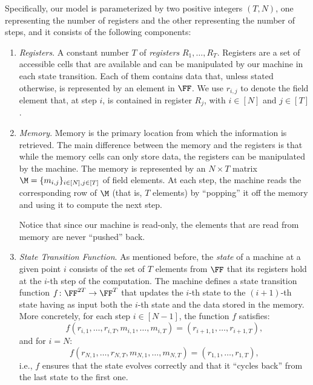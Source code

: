 Specifically, our model is parameterized by two positive integers $(T, N)$, one representing the number of registers and the other representing the number of steps, and it consists of the following components:
\begin{enumerate}
\item \textit{Registers}. A constant number $T$ of \textit{registers} $R_1,\dots,R_T$. Registers are a set of accessible cells that are available and can be manipulated by our machine in each state transition. Each of them contains data that, unless stated otherwise, is represented by an element in $\FF$. We use $r_{i,j}$ to denote the field element that, at step $i$, is contained in register $R_j$, with $i\in[N]$ and $j \in [T]$. 
    

\item \textit{Memory}. Memory is the primary location from which the information is retrieved. The main difference between the memory and the registers is that while the memory cells can only store data, the registers can be manipulated by the machine. The memory is represented by an $N \times T$ matrix $\M = \{m_{i,j}\}_{i\in[N],j\in[T]}$ of field elements. At each step, the machine reads the corresponding row of $\M$ (that is, $T$ elements) by ``popping'' it off the memory and using it to compute the next step. 
\begin{remark}
    Notice that since our machine is read-only, the elements that are read from memory are never ``pushed'' back.
\end{remark}


\item \textit{State Transition Function}. As mentioned before, the \textit{state} of a machine at a given point $i$ consists of the set of $T$ elements from $\FF$ that its registers hold at the $i$-th step of the computation. The machine defines a state transition function $f \colon \FF^{2T} \to \FF^T$ that updates the $i$-th state to the $(i+1)$-th state having as input both the $i$-th state and the data stored in the memory. More concretely, for each step $i \in [N-1]$, the function $f$ satisfies:
\[
f(r_{i,1},\dots,r_{i,T},m_{i,1},\dots,m_{i,T}) = (r_{i+1,1},\dots,r_{i+1,T}),
\]
and for $i = N$:
\[
f(r_{N,1},\dots,r_{N,T},m_{N,1},\dots,m_{N,T}) = (r_{1,1},\dots,r_{1,T}),
\]
i.e., $f$ ensures that the state evolves correctly and that it ``cycles back'' from the last state to the first one.


\end{enumerate}
